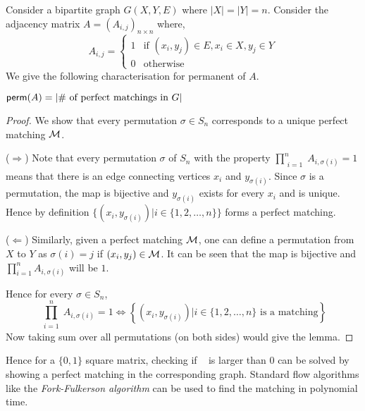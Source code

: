 Consider a bipartite graph $G(X, Y, E)$ where $|X|=|Y| = n$. Consider the
adjacency matrix $A=(A_{i,j})_{n \times n}$ where,
\[ A_{i,j} = \left \{
	\begin{array}{rl}
	 1 & \text{if } (x_i,y_j) \in E, x_i \in X, y_j \in Y \\
	 0 & \text{otherwise}
	\end{array} \right . \]
We give the following characterisation for permanent of $A$.
\begin{lemma}
${\sf perm}(A) = \left | \text{\# of perfect matchings in } G \right |$
\end{lemma}
\begin{proof}
We show that every permutation $\sigma \in S_n$ corresponds to a unique
perfect matching ${\cal M}$.

($\Rightarrow$) Note that every permutation $\sigma$ of $S_n$ with the property
$\prod_{\substack{i=1}}^n A_{i, \sigma(i)} = 1$ means that there is an edge
connecting vertices $x_i$ and $y_{\sigma(i)}$. Since $\sigma$ is a permutation,
the map is bijective and $y_{\sigma(i)}$ exists for every $x_i$ and is
unique. Hence by definition $\{(x_i, y_{\sigma(i)})| i \in \{1, 2, \ldots,
n\}\}$ forms a perfect matching. 

($\Leftarrow$) Similarly, given a perfect matching ${\cal M}$,
one can define a permutation from $X$ to $Y$ as $\sigma(i)=j$ if $(x_i, y_j)
\in {\cal M}$. It can be seen that the map is bijective and $\prod_{i=1}^n A_{i,
\sigma(i)}$ will be $1$. 

Hence for every $\sigma \in S_n$,
\begin{equation} 
\label{eq:arg}
\prod_{\substack{i=1}}^n A_{i,\sigma(i)} = 1 \iff \left \{ (x_i,
y_{\sigma(i)}) | i \in \{1, 2, \ldots, n \} \text{ is a matching} \right \} 
\end{equation}
Now taking sum over all permutations (on both sides) would give the lemma.
\end{proof}

Hence for a $\{0,1\}$ square matrix, checking if \perm~ is larger than $0$ can
be solved by showing a perfect matching in the corresponding graph.
Standard flow algorithms like the \emph{Fork-Fulkerson algorithm} can be used to find the 
matching in polynomial time.

